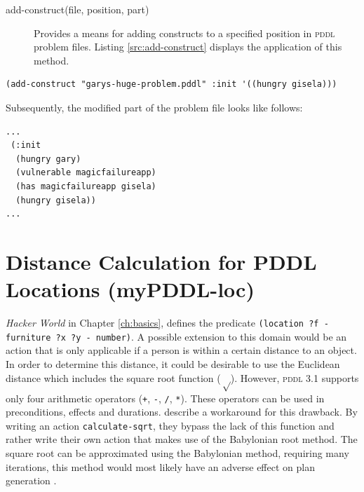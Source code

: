 \documentclass[a4paper,12pt]{report}
\newcommand{\pddl}{\textsc{pddl}\xspace}
\begin{document}
\begin{description}
\item[{add-construct(file, position, part)}] Provides a means for adding
constructs to a specified position in \pddl problem files.
Listing \ref{src:add-construct} displays the application of this method.
\end{description}

\begin{listing}[H]
\begin{verbatim}
(add-construct "garys-huge-problem.pddl" :init '((hungry gisela)))
\end{verbatim}
\caption{\label{src:add-construct}Adding the predicate (hungry gisela) to \emph{Gary's Huge Problem} using the PDDL/Clojure interface.}
\end{listing}

Subsequently, the modified part of the problem file looks like
follows: \hspace{0.3cm}
\begin{verbatim}
...
 (:init
  (hungry gary)
  (vulnerable magicfailureapp)
  (has magicfailureapp gisela)
  (hungry gisela))
...
\end{verbatim}

\section{Distance Calculation for PDDL Locations (myPDDL-loc)}
\label{sec-4-5}
\label{subsec:loc}

\emph{Hacker World} in Chapter \ref{ch:basics}, defines the predicate \texttt{(location
?f - furniture ?x ?y - number)}. A possible extension to this domain
would be an action that is only applicable if a person is within a
certain distance to an object. In order to determine this distance, it
could be desirable to use the Euclidean distance which includes the
square root function (\(\sqrt\)). However, \pddl3.1 supports only four
arithmetic operators (\texttt{+}, \texttt{-}, \texttt{/}, \texttt{*}). These operators can be used
in preconditions, effects and durations.
\textcite{parkinson2012increasing} describe a workaround for this
drawback. By writing an action \texttt{calculate-sqrt}, they bypass the lack
of this function and rather write their own action that makes use of
the Babylonian root method. The square root can be approximated using
the Babylonian method, requiring many iterations, this method would
most likely have an adverse effect on plan generation
\cite{parkinson2012increasing}.
\end{document}

